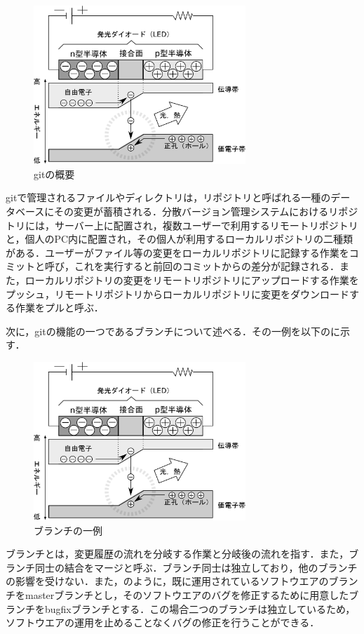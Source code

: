\documentclass[a4paper,10pt,twocolumn]{jsarticle}
\begin{document}
\begin{figure}[h]
\centering
\includegraphics[width=80mm]{img/function.eps}
\caption{gitの概要}
\label{git}
\end{figure}

gitで管理されるファイルやディレクトリは，リポジトリと呼ばれる一種のデータベースにその変更が蓄積される．分散バージョン管理システムにおけるリポジトリには，サーバー上に配置され，複数ユーザーで利用するリモートリポジトリと，個人のPC内に配置され，その個人が利用するローカルリポジトリの二種類がある．ユーザーがファイル等の変更をローカルリポジトリに記録する作業をコミットと呼び，これを実行すると前回のコミットからの差分が記録される．また，ローカルリポジトリの変更をリモートリポジトリにアップロードする作業をプッシュ，リモートリポジトリからローカルリポジトリに変更をダウンロードする作業をプルと呼ぶ．

次に，gitの機能の一つであるブランチについて述べる．その一例を以下のに示す．

\begin{figure}[h]
\centering
\includegraphics[width=80mm]{img/function.eps}
\caption{ブランチの一例}
\label{branch}
\end{figure}

ブランチとは，変更履歴の流れを分岐する作業と分岐後の流れを指す．また，ブランチ同士の結合をマージと呼ぶ．ブランチ同士は独立しており，他のブランチの影響を受けない．また，のように，既に運用されているソフトウエアのブランチをmasterブランチとし，そのソフトウエアのバグを修正するために用意したブランチをbugfixブランチとする．この場合二つのブランチは独立しているため，ソフトウエアの運用を止めることなくバグの修正を行うことができる．
\end{document}
